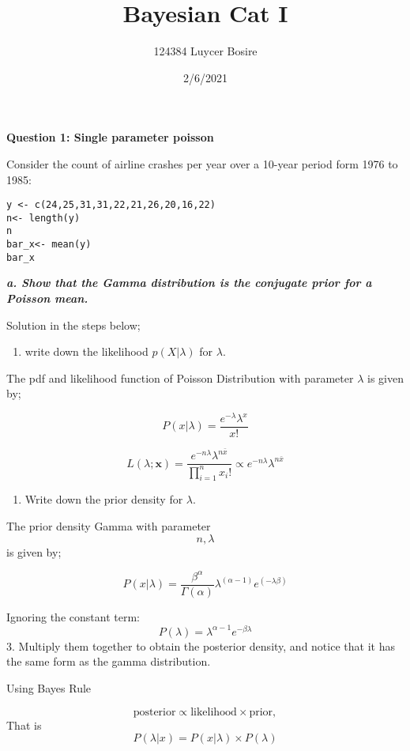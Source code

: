 \documentclass[
]{article}
\title{Bayesian Cat I}
\author{124384 Luycer Bosire}
\date{2/6/2021}
\providecommand{\tightlist}{%
  \setlength{\itemsep}{0pt}\setlength{\parskip}{0pt}}
\begin{document}
\maketitle

\textbf{Question 1: Single parameter poisson}

Consider the count of airline crashes per year over a 10-year period
form 1976 to 1985:

\begin{verbatim}
y <- c(24,25,31,31,22,21,26,20,16,22)
n<- length(y)
n
bar_x<- mean(y)
bar_x
\end{verbatim}

\textbf{\emph{a. Show that the Gamma distribution is the conjugate prior
for a Poisson mean.}}

Solution in the steps below;

\begin{enumerate}
\def\labelenumi{\arabic{enumi}.}
\tightlist
\item
  write down the likelihood \(p(X|\lambda)\) for \(\lambda\).
\end{enumerate}

The pdf and likelihood function of Poisson Distribution with parameter
\(\lambda\) is given by;

\[ P(x| \lambda) = \frac {e^{-\lambda}\lambda^{x}}{x!} \]

\[ L(\lambda; \pmb x) = \frac {e^{-n\lambda}\lambda^{n\bar x}}{\prod_{i=1}^nx_i!}\propto e^{-n\lambda}\lambda^{n\bar x} \]

\begin{enumerate}
\def\labelenumi{\arabic{enumi}.}
\setcounter{enumi}{1}
\tightlist
\item
  Write down the prior density for \(\lambda\).
\end{enumerate}

The prior density Gamma with parameter \[n, \lambda\] is given by;

\[ P(x |\lambda)= \frac {\beta^\alpha} {\Gamma(\alpha)} {\lambda^{(\alpha-1)}} {e^ {(-\lambda\beta)}} \]

Ignoring the constant term:
\[P(\lambda)=\lambda^{\alpha-1}e^{-\beta\lambda}\] 3. Multiply them
together to obtain the posterior density, and notice that it has the
same form as the gamma distribution.

Using Bayes Rule

\[\text{posterior} \propto \text{likelihood} \times \text{prior},\] That
is \[P(\lambda|x)=P(x|\lambda) \times P(\lambda)\]
\end{document}
